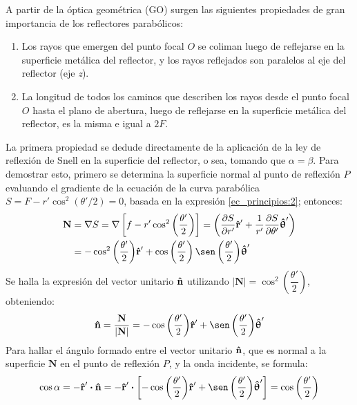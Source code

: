 A partir de la óptica geométrica (GO) surgen las siguientes propiedades de gran importancia de los reflectores parabólicos:
\begin{enumerate}
\item Los rayos que emergen del punto focal $O$ se coliman luego de reflejarse en la superficie metálica del reflector, y los rayos reflejados son paralelos al eje del reflector (eje \emph{z}).
\item La longitud de todos los caminos que describen los rayos desde el punto focal $O$ hasta el plano de abertura, luego de reflejarse en la superficie metálica del reflector, es la misma e igual a $2F$.
\end{enumerate}
La primera propiedad se dedude directamente de la aplicación de la ley de reflexión de Snell en la superficie del reflector, o sea, tomando que $\alpha = \beta$. Para demostrar esto, primero se determina la superficie normal al punto de reflexión $P$ evaluando el gradiente de la ecuación de la curva parabólica $S = F - r'\cos^2\left(\theta '/2\right) = 0$, basada en la expresión \eqref{ec_principios:2}; entonces:
\begin{align}
\begin{split}
\mathbf{N} &= \nabla S = \nabla\left[f - r'\cos^2\left(\frac{\theta '}{2}\right)\right] = \left(\frac{\partial S}{\partial r'}\versor{r}' + \frac{1}{r'}\frac{\partial S}{\partial\theta '}\versor{\uptheta}'\right)\\
&= -\cos^2\left(\frac{\theta '}{2}\right)\!\versor{r}' + \cos\left(\frac{\theta '}{2}\right)\sen\left(\frac{\theta '}{2}\right)\!\versor{\uptheta}'
\end{split}
\label{ec_principios:5}
\end{align}
Se halla la expresión del vector unitario $\bm{\mathbf{\hat{n}}}$ utilizando $|\mathbf{N}| = \cos^2\left(\dfrac{\theta '}{2}\right)$, obteniendo:
\begin{align}
\versor{n} = \frac{\mathbf{N}}{|\mathbf{N}|} = -\cos\left(\frac{\theta '}{2}\right)\!\versor{r}' + \sen\left(\frac{\theta '}{2}\right)\!\versor{\uptheta}'
\label{ec_principios:6}
\end{align}
Para hallar el ángulo formado entre el vector unitario $\bm{\mathbf{\hat{n}}}$, que es normal a la superficie $\mathbf{N}$ en el punto de reflexión $P$, y la onda incidente, se formula:
\begin{align}
\cos\alpha = -\versor{r}'\prodesc\versor{n} = -\versor{r}'\prodesc\left[-\cos\left(\frac{\theta '}{2}\right)\!\versor{r}' + \sen\left(\frac{\theta '}{2}\right)\!\versor{\uptheta}'\right] = \cos\left(\frac{\theta '}{2}\right)
\label{ec_principios:7}
\end{align}
